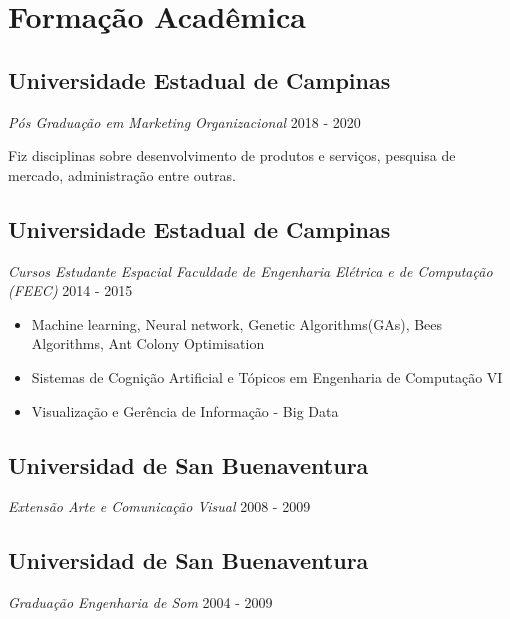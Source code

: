 \documentclass[a4paper,10pt]{article}
\begin{document}

\section*{Formação Acadêmica}
\noindent\makebox[\linewidth]{\rule{\linewidth}{0.1mm}\textcolor{corLarge}{}}

\subsection*{Universidade Estadual de Campinas}
\textcolor{corSubSection}{\emph{Pós Graduação em Marketing Organizacional}}
\hfill \textcolor{corSubSection}{2018 - 2020}

Fiz disciplinas sobre desenvolvimento de produtos e serviços,
pesquisa de mercado, administração entre outras.


\subsection*{Universidade Estadual de Campinas}
\textcolor{corSubSection}{\emph{Cursos Estudante Espacial Faculdade de Engenharia Elétrica e de Computação (FEEC)}}
\hfill \textcolor{corSubSection}{2014 - 2015}

\begin{itemize}
    \item Machine learning, Neural network, Genetic Algorithms(GAs), Bees Algorithms, Ant Colony Optimisation
    \item Sistemas de Cognição Artificial e Tópicos em Engenharia de Computação VI
    \item Visualização e Gerência de Informação - Big Data
\end{itemize}

\subsection*{Universidad de San Buenaventura}
\textcolor{corSubSection}{\emph{Extensão Arte e Comunicação Visual}}
\hfill \textcolor{corSubSection}{2008 - 2009}

\subsection*{Universidad de San Buenaventura}
\textcolor{corSubSection}{\emph{Graduação Engenharia de Som}}
\hfill \textcolor{corSubSection}{2004 - 2009}








\end{document}

